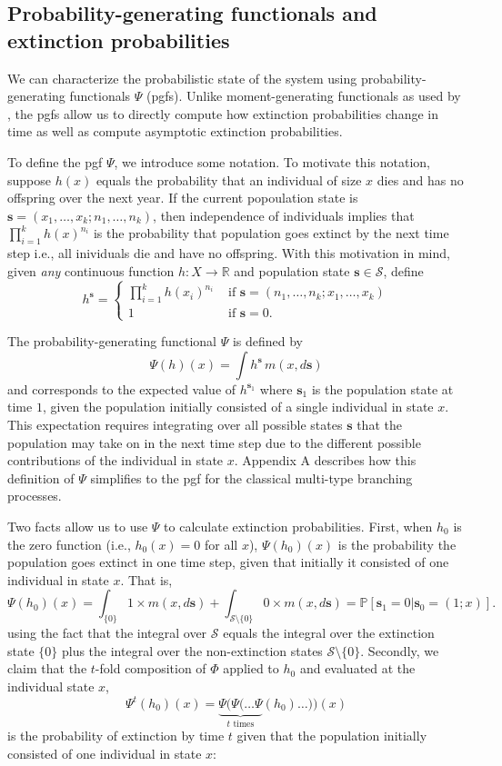 \documentclass[12pt]{amsart}\usepackage[]{graphicx}\usepackage[]{color}
\def\R{\mathbb R}
\def\P{\mathbb P}
\def\S{\mathcal S}
\def\s{\mathbf s}
\begin{document}
\subsection*{Probability-generating functionals and extinction probabilities}

We can characterize the probabilistic state of the system using probability-generating functionals $\Psi$ (pgfs). Unlike moment-generating functionals as used by \citet{harris-63}, the pgfs allow us to directly compute how extinction probabilities change in time as well as compute asymptotic extinction probabilities.

To define the pgf $\Psi$, we introduce some notation. To motivate this notation, suppose $h(x)$ equals the probability that an individual of size $x$ dies and has no offspring over the next year. If the current popoulation state is $\s=(x_1,\dots,x_k;n_1,\dots,n_k)$, then independence of individuals implies that $\prod_{i=1}^kh(x)^{n_i}$ is the probability that population goes extinct by the next time step i.e., all inividuals die and have no offspring. With this motivation in mind, given \emph{any} continuous function $h:X\to\R$ and population state $\s\in\S$, define
\[
h^\s=
\left\{
\begin{array}{cc}
\prod_{i=1}^k h(x_i)^{n_i}&\mbox{ if }\s=(n_1, \dots, n_k;x_1, \dots, x_k)\\
1 &\mbox{ if }\s=0.
\end{array}
\right.
\]

The probability-generating functional $\Psi$ is defined by
\begin{equation}\label{*}
\Psi(h)(x)=\int h^\s \, m(x, d\s)
\end{equation}
and corresponds to the expected value of $h^{\s_1}$ where $\s_1$ is the population state at time $1$, given the population initially consisted of a single individual in state $x$. This expectation requires integrating over all possible states $\s$ that the population may take on in the next time step due to the different possible contributions of the individual in state $x$. Appendix A describes how this definition of $\Psi$ simplifies to the pgf for the classical multi-type branching processes.

Two facts allow us to use $\Psi$ to calculate extinction probabilities. First, when $h_0$ is the zero function (i.e., $h_0(x)=0$ for all $x$), $\Psi(h_0)(x)$ is the probability the population goes extinct in one time step, given that initially it consisted of one individual in state $x$. That is,
\begin{equation}\label{star}
\Psi(h_0)(x)=\int_{\{0\}} 1\times m(x, d\s)+\int_{\S\setminus \{0\}} 0\times m(x,d\s)= \P[\s_1=0|\s_0=(1;x)].
\end{equation}
using the fact that the integral over $\S$ equals the integral over the extinction state $\{0\}$ plus the integral over the non-extinction states $\S\setminus \{0\}$. Secondly, we claim that the $t$-fold composition of $\Phi$ applied to $h_0$ and evaluated at the individual state $x$,
\[
\Psi^t(h_0)(x)=\underbrace{\Psi(\Psi(\dots \Psi}_{\mbox{$t$ times}}(h_0)\dots))(x)
\]
is the probability of extinction by time $t$ given that the population initially consisted of one individual in state $x$:
\end{document}
